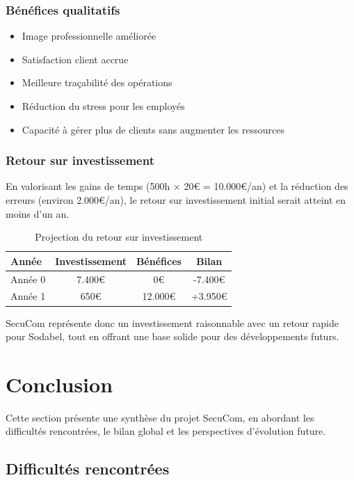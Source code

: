 \documentclass[12pt,a4paper]{report}
\begin{document}
\subsection{Bénéfices qualitatifs}

\begin{itemize}
  \item Image professionnelle améliorée
  \item Satisfaction client accrue
  \item Meilleure traçabilité des opérations
  \item Réduction du stress pour les employés
  \item Capacité à gérer plus de clients sans augmenter les ressources
\end{itemize}

\subsection{Retour sur investissement}

En valorisant les gains de temps (500h × 20€ = 10.000€/an) et la réduction des erreurs (environ 2.000€/an), le retour sur investissement initial serait atteint en moins d'un an.

\begin{table}[h]
\centering
\begin{tabular}{|l|c|c|c|}
\hline
\textbf{Année} & \textbf{Investissement} & \textbf{Bénéfices} & \textbf{Bilan} \\
\hline
Année 0 & 7.400€ & 0€ & -7.400€ \\
Année 1 & 650€ & 12.000€ & +3.950€ \\
\hline
\end{tabular}
\caption{Projection du retour sur investissement}
\end{table}

SecuCom représente donc un investissement raisonnable avec un retour rapide pour Sodabel, tout en offrant une base solide pour des développements futurs.

\chapter{Conclusion}

Cette section présente une synthèse du projet SecuCom, en abordant les difficultés rencontrées, le bilan global et les perspectives d'évolution future.

\section{Difficultés rencontrées}
\end{document}
